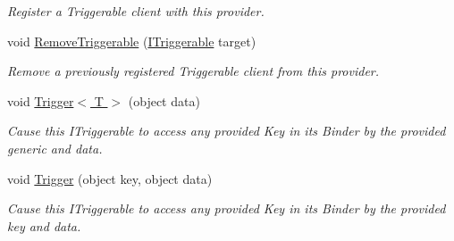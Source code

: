 \begin{DoxyCompactItemize}
\begin{DoxyCompactList}\small\item\em Register a Triggerable client with this provider. \end{DoxyCompactList}\item 
\hypertarget{classstrange_1_1extensions_1_1dispatcher_1_1eventdispatcher_1_1impl_1_1_event_dispatcher_a805d419bf0bad3be1cba8961575e70d7}{void \hyperlink{classstrange_1_1extensions_1_1dispatcher_1_1eventdispatcher_1_1impl_1_1_event_dispatcher_a805d419bf0bad3be1cba8961575e70d7}{Remove\-Triggerable} (\hyperlink{interfacestrange_1_1extensions_1_1dispatcher_1_1api_1_1_i_triggerable}{I\-Triggerable} target)}\label{classstrange_1_1extensions_1_1dispatcher_1_1eventdispatcher_1_1impl_1_1_event_dispatcher_a805d419bf0bad3be1cba8961575e70d7}

\begin{DoxyCompactList}\small\item\em Remove a previously registered Triggerable client from this provider. \end{DoxyCompactList}\item 
\hypertarget{classstrange_1_1extensions_1_1dispatcher_1_1eventdispatcher_1_1impl_1_1_event_dispatcher_a00aa67359048450f440195fcb6303279}{void \hyperlink{classstrange_1_1extensions_1_1dispatcher_1_1eventdispatcher_1_1impl_1_1_event_dispatcher_a00aa67359048450f440195fcb6303279}{Trigger$<$ T $>$} (object data)}\label{classstrange_1_1extensions_1_1dispatcher_1_1eventdispatcher_1_1impl_1_1_event_dispatcher_a00aa67359048450f440195fcb6303279}

\begin{DoxyCompactList}\small\item\em Cause this I\-Triggerable to access any provided Key in its Binder by the provided generic and data. \end{DoxyCompactList}\item 
\hypertarget{classstrange_1_1extensions_1_1dispatcher_1_1eventdispatcher_1_1impl_1_1_event_dispatcher_a0360965a7abcec6aaf0d0d139cdba649}{void \hyperlink{classstrange_1_1extensions_1_1dispatcher_1_1eventdispatcher_1_1impl_1_1_event_dispatcher_a0360965a7abcec6aaf0d0d139cdba649}{Trigger} (object key, object data)}\label{classstrange_1_1extensions_1_1dispatcher_1_1eventdispatcher_1_1impl_1_1_event_dispatcher_a0360965a7abcec6aaf0d0d139cdba649}

\begin{DoxyCompactList}\small\item\em Cause this I\-Triggerable to access any provided Key in its Binder by the provided key and data. \end{DoxyCompactList}\end{DoxyCompactItemize}
